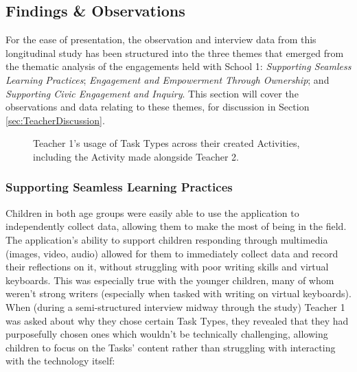 \subsection{Findings \& Observations}

For the ease of presentation, the observation and interview data from this longitudinal study has been structured into the three themes that emerged from the thematic analysis of the engagements held with School 1: \textit{Supporting Seamless Learning Practices}; \textit{Engagement and Empowerment Through Ownership}; and \textit{Supporting Civic Engagement and Inquiry}. This section will cover the observations and data relating to these themes, for discussion in Section \ref{sec:TeacherDiscussion}.

\begin{figure}
    \centering
    \caption[Teacher 1's usage of Task Types across their created Activities]{Teacher 1's usage of Task Types across their created Activities, including the Activity made alongside Teacher 2.}
    \label{fig:TaskTypeUsage}
\end{figure}

\subsubsection{Supporting Seamless Learning Practices}

Children in both age groups were easily able to use the application to independently collect data, allowing them to make the most of being in the field. The application's ability to support children responding through multimedia (images, video, audio) allowed for them to immediately collect data and record their reflections on it, without struggling with poor writing skills and virtual keyboards. This was especially true with the younger children, many of whom weren't strong writers (especially when tasked with writing on virtual keyboards). When (during a semi-structured interview midway through the study) Teacher 1 was asked about why they chose certain Task Types, they revealed that they had purposefully chosen ones which wouldn't be technically challenging, allowing children to focus on the Tasks' content rather than struggling with interacting with the technology itself: 

